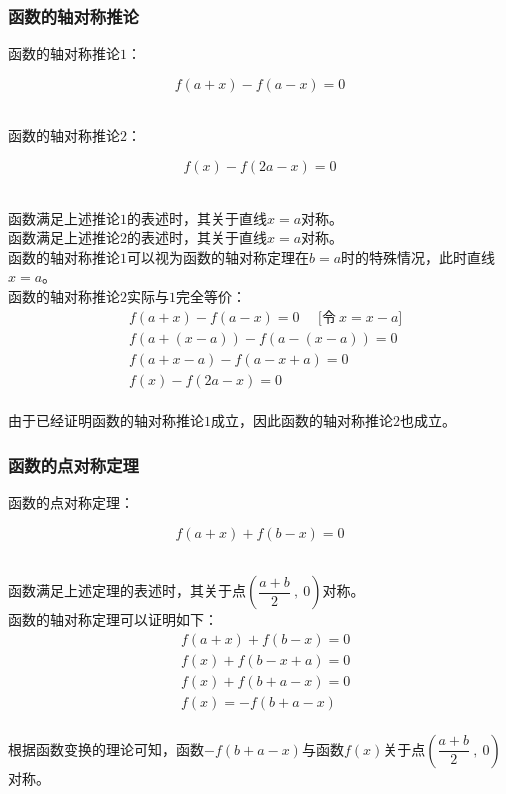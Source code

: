 \documentclass[UTF8]{ctexart}
\begin{document}
\subsubsection{函数的轴对称推论}
    \setcounter{equation}{0}
    函数的轴对称推论$1$：
    \begin{large}
        \begin{equation*}
            f(a+x)-f(a-x)=0
        \end{equation*}
    \end{large}\\
    函数的轴对称推论$2$：
    \begin{large}
        \begin{equation*}
            f(x)-f(2a-x)=0
        \end{equation*}
    \end{large}\\
    函数满足上述推论$1$的表述时，其关于直线$x=a$对称。\\[3mm]
    函数满足上述推论$2$的表述时，其关于直线$x=a$对称。\\[3mm]
    函数的轴对称推论$1$可以视为函数的轴对称定理在$b=a$时的特殊情况，此时直线$x=a$。\\[3mm]
    函数的轴对称推论$2$实际与$1$完全等价：\vspace{1pt}
    \begin{align}
        &f(a+x)-f(a-x)=0~~~~~~\big[\text{令}~x=x-a\big]\\[2mm]
        &f(a+(x-a))-f(a-(x-a))=0\\[2mm]
        &f(a+x-a)-f(a-x+a)=0\\[2mm]
        &f(x)-f(2a-x)=0
    \end{align}\\
    由于已经证明函数的轴对称推论$1$成立，因此函数的轴对称推论$2$也成立。

\newpage

\subsubsection{函数的点对称定理}
    \setcounter{equation}{0}
    函数的点对称定理：
    \begin{large}
        \begin{equation*}
            f(a+x)+f(b-x)=0
        \end{equation*}
    \end{large}\\
    函数满足上述定理的表述时，其关于点$\left(\dfrac{a+b}{2}~,~0\right)$对称。\\[3mm]
    函数的轴对称定理可以证明如下：
    \begin{align}
        &f(a+x)+f(b-x)=0\\[2mm]
        &f(x)+f(b-x+a)=0\\[2mm]
        &f(x)+f(b+a-x)=0\\[2mm]
        &f(x)=-f(b+a-x)
    \end{align}\\
    根据函数变换的理论可知，函数$-f(b+a-x)$与函数$f(x)$关于点$\left(\dfrac{a+b}{2}~,~0\right)$对称。
\end{document}

